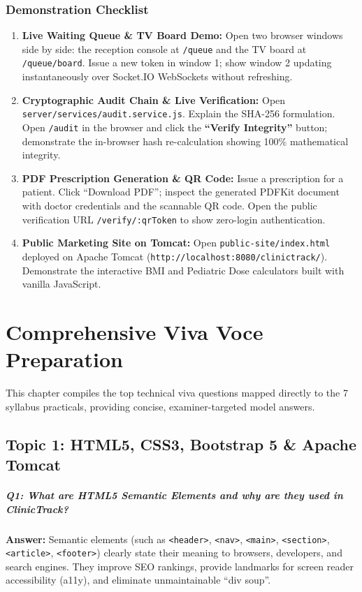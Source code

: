 \documentclass[12pt,a4paper,oneside]{report}
\begin{document}
\subsection{Demonstration Checklist}
\begin{enumerate}
    \item \textbf{Live Waiting Queue \& TV Board Demo:} Open two browser windows side by side: the reception console at \texttt{/queue} and the TV board at \texttt{/queue/board}. Issue a new token in window 1; show window 2 updating instantaneously over Socket.IO WebSockets without refreshing.
    \item \textbf{Cryptographic Audit Chain \& Live Verification:} Open \texttt{server/services/audit.service.js}. Explain the SHA-256 formulation. Open \texttt{/audit} in the browser and click the \textbf{``Verify Integrity''} button; demonstrate the in-browser hash re-calculation showing 100\% mathematical integrity.
    \item \textbf{PDF Prescription Generation \& QR Code:} Issue a prescription for a patient. Click ``Download PDF''; inspect the generated PDFKit document with doctor credentials and the scannable QR code. Open the public verification URL \texttt{/verify/:qrToken} to show zero-login authentication.
    \item \textbf{Public Marketing Site on Tomcat:} Open \texttt{public-site/index.html} deployed on Apache Tomcat (\texttt{http://localhost:8080/clinictrack/}). Demonstrate the interactive BMI and Pediatric Dose calculators built with vanilla JavaScript.
\end{enumerate}

\chapter{Comprehensive Viva Voce Preparation}

This chapter compiles the top technical viva questions mapped directly to the 7 syllabus practicals, providing concise, examiner-targeted model answers.

\section{Topic 1: HTML5, CSS3, Bootstrap 5 \& Apache Tomcat}
\paragraph{Q1: What are HTML5 Semantic Elements and why are they used in ClinicTrack?}
\textbf{Answer:} Semantic elements (such as \texttt{<header>}, \texttt{<nav>}, \texttt{<main>}, \texttt{<section>}, \texttt{<article>}, \texttt{<footer>}) clearly state their meaning to browsers, developers, and search engines. They improve SEO rankings, provide landmarks for screen reader accessibility (a11y), and eliminate unmaintainable ``div soup''.
\end{document}
